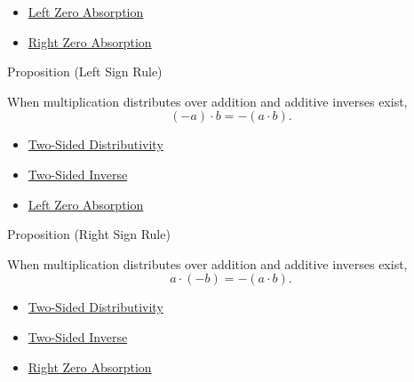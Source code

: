 \begin{dependencies}
\begin{itemize}
  \item \hyperref[prop:left-zero-absorption]{Left Zero Absorption}
  \item \hyperref[prop:right-zero-absorption]{Right Zero Absorption}
\end{itemize}
\end{dependencies}

\begin{propositionbox}{Proposition (Left Sign Rule)}
\begin{proposition}
\label{prop:left-sign-rule}
When multiplication distributes over addition and additive inverses exist,
\[
(-a)\cdot b=-(a\cdot b).
\]
\end{proposition}
\end{propositionbox}

\begin{dependencies}
\begin{itemize}
  \item \hyperref[def:two-sided-distributivity]{Two-Sided Distributivity}
  \item \hyperref[def:two-sided-inverse]{Two-Sided Inverse}
  \item \hyperref[prop:left-zero-absorption]{Left Zero Absorption}
\end{itemize}
\end{dependencies}

\begin{propositionbox}{Proposition (Right Sign Rule)}
\begin{proposition}
\label{prop:right-sign-rule}
When multiplication distributes over addition and additive inverses exist,
\[
a\cdot(-b)=-(a\cdot b).
\]
\end{proposition}
\end{propositionbox}

\begin{dependencies}
\begin{itemize}
  \item \hyperref[def:two-sided-distributivity]{Two-Sided Distributivity}
  \item \hyperref[def:two-sided-inverse]{Two-Sided Inverse}
  \item \hyperref[prop:right-zero-absorption]{Right Zero Absorption}
\end{itemize}
\end{dependencies}

